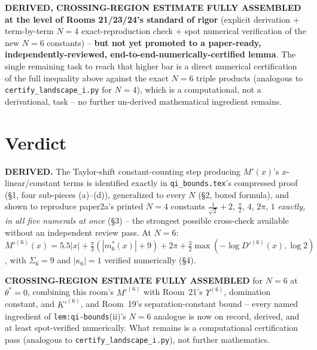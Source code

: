 \documentclass[11pt]{article}
\begin{document}
\textbf{DERIVED, CROSSING-REGION ESTIMATE FULLY ASSEMBLED at the level of Rooms 21/23/24's
standard of rigor} (explicit derivation + term-by-term $N=4$ exact-reproduction check + spot
numerical verification of the new $N=6$ constants) -- \textbf{but not yet promoted to a
paper-ready, independently-reviewed, end-to-end-numerically-certified lemma}. The single remaining
task to reach that higher bar is a direct numerical certification of the full inequality above
against the exact $N=6$ triple products (analogous to \texttt{certify\_landscape\_i.py} for $N=4$),
which is a computational, not a derivational, task -- no further un-derived mathematical ingredient
remains.

\section*{Verdict}

\textbf{DERIVED.} The Taylor-shift constant-counting step producing $M'(x)$'s $x$-linear/constant
terms is identified exactly in \texttt{qi\_bounds.tex}'s compressed proof (\S1, four sub-pieces
(a)--(d)), generalized to every $N$ (\S2, boxed formula), and shown to reproduce paper2a's printed
$N=4$ constants $\frac1{\sqrt2}+2$, $\frac\pi2$, $4$, $2\pi$, $1$ \emph{exactly, in all five
numerals at once} (\S3) -- the strongest possible cross-check available without an independent
review pass. At $N=6$: $M'^{(6)}(x)=5.5|x|+\frac\pi3(|m^\ast_6(x)|+9)+2\pi+\frac32\max(-\log
D'^{(6)}(x),\log2)$, with $\Sigma_6=9$ and $|\kappa_6|=1$ verified numerically (\S4).

\textbf{CROSSING-REGION ESTIMATE FULLY ASSEMBLED} for $N=6$ at $\theta^\ast=0$, combining this
room's $M'^{(6)}$ with Room~21's $\Upsilon^{(6)}$, domination constant, and $K'^{(6)}$, and
Room~19's separation-constant bound -- every named ingredient of \texttt{lem:qi-bounds}(ii)'s
$N=6$ analogue is now on record, derived, and at least spot-verified numerically. What remains is
a computational certification pass (analogous to \texttt{certify\_landscape\_i.py}), not further
mathematics.
\end{document}

